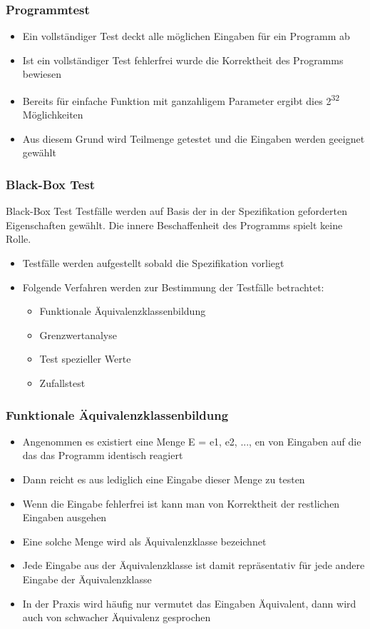 \begin{frame}
\frametitle{Programmtest}
	\begin{itemize}
		\item Ein vollständiger Test deckt alle möglichen Eingaben für ein Programm ab
		\item Ist ein vollständiger Test fehlerfrei wurde die Korrektheit des Programms bewiesen
		\item Bereits für einfache Funktion mit ganzahligem Parameter ergibt dies 2\textsuperscript{32} Möglichkeiten
		\item Aus diesem Grund wird Teilmenge getestet und die Eingaben werden geeignet gewählt
	\end{itemize}
\end{frame}

\begin{frame}
\frametitle{Black-Box Test}
	\begin{block}{Black-Box Test}
		Testfälle werden auf Basis der in der Spezifikation geforderten Eigenschaften gewählt.
		Die innere Beschaffenheit des Programms spielt keine Rolle.
	\end{block}
	\begin{itemize}
		\item Testfälle werden aufgestellt sobald die Spezifikation vorliegt
		\item Folgende Verfahren werden zur Bestimmung der Testfälle betrachtet:
			\begin{itemize}
				\item Funktionale Äquivalenzklassenbildung
				\item Grenzwertanalyse
				\item Test spezieller Werte
				\item Zufallstest
			\end{itemize}
	\end{itemize}
\end{frame}

\begin{frame}
\frametitle{Funktionale Äquivalenzklassenbildung}
	\begin{itemize}
		\item Angenommen es existiert eine Menge E = {e1, e2, ..., en} von Eingaben auf die das
					das Programm identisch reagiert
		\item Dann reicht es aus lediglich eine Eingabe dieser Menge zu testen
		\item Wenn die Eingabe fehlerfrei ist kann man von Korrektheit der restlichen Eingaben ausgehen
		\item Eine solche Menge wird als Äquivalenzklasse bezeichnet
		\item Jede Eingabe aus der Äquivalenzklasse ist damit repräsentativ für jede andere Eingabe
					der Äquivalenzklasse
		\item In der Praxis wird häufig nur vermutet das Eingaben Äquivalent, dann wird auch von
					schwacher Äquivalenz gesprochen
	\end{itemize}
\end{frame}

